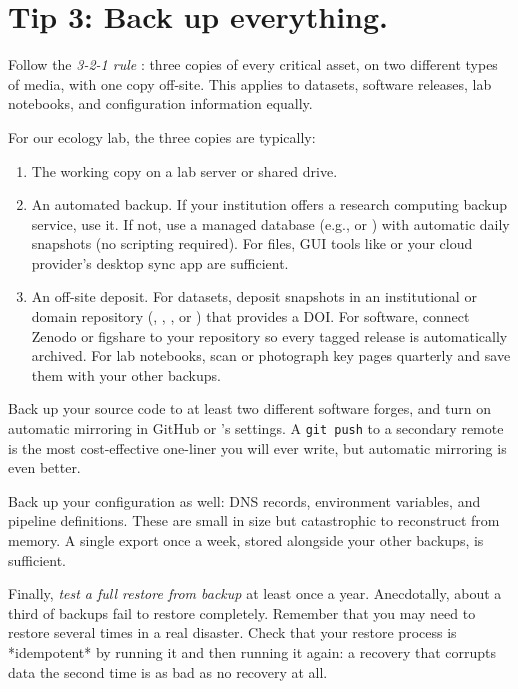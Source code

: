 \documentclass[10pt,letterpaper]{article}
\begin{document}
\section*{Tip 3: Back up everything.}

Follow the \emph{3-2-1 rule} \cite{krogh2009}: three copies of every critical
asset, on two different types of media, with one copy off-site. This applies to
datasets, software releases, lab notebooks, and configuration information
equally.

For our ecology lab, the three copies are typically:

\begin{enumerate}
\item
  The working copy on a lab server or shared drive.
\item
  An automated backup. If your institution offers a research computing backup
  service, use it. If not, use a managed database (e.g.,  or
  ) with automatic daily snapshots (no scripting
  required). For files, GUI tools like  or your cloud
  provider's desktop sync app are sufficient.
\item
  An off-site deposit. For datasets, deposit snapshots in an institutional or
  domain repository (,
  , ,
  or ) that provides a DOI. For software, connect Zenodo or figshare
  to your repository so every tagged release is automatically archived. For
  lab notebooks, scan or photograph key pages quarterly and save them with
  your other backups.
\end{enumerate}

Back up your source code to at least two different software forges, and turn on
automatic mirroring in GitHub or 's settings. A
\texttt{git push} to a secondary remote is the most cost-effective one-liner you
will ever write, but automatic mirroring is even better.

Back up your configuration as well: DNS records, environment variables, and
pipeline definitions. These are small in size but catastrophic to reconstruct
from memory. A single export once a week, stored alongside your other backups,
is sufficient.

Finally, \emph{test a full restore from backup} at least once a year.
Anecdotally, about a third of backups fail to restore completely. Remember that
you may need to restore several times in a real disaster. Check that your
restore process is *idempotent* by running it and then running it again: a
recovery that corrupts data the second time is as bad as no recovery at all.
\end{document}

